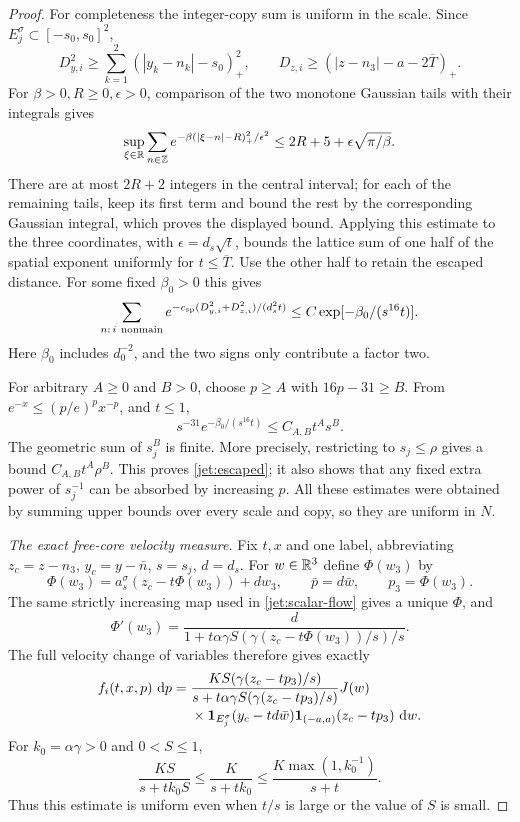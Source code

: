 \begin{proof}
For completeness the integer-copy sum is uniform in the scale.
Since \(E_j^\sigma\subset[-s_0,s_0]^2\),
\[
 D_{y,i}^2\ge
   \sum_{k=1}^2(|y_k-n_k|-s_0)_+^2,\qquad
 D_{z,i}\ge
   (|z-n_3|-a-2\overline T)_+.
\]
For \(\beta>0,R\ge0,\epsilon>0\), comparison of the two monotone
Gaussian tails with their integrals gives
\[
 \sup_{\xi\in\mathbb R}\sum_{n\in\mathbb Z}
 e^{-\beta(|\xi-n|-R)_+^2/\epsilon^2}
 \le 2R+5+\epsilon\sqrt{\pi/\beta}.
\]
There are at most \(2R+2\) integers in the central interval; for
each of the remaining tails, keep its first term and bound the
rest by the corresponding Gaussian integral, which proves the
displayed bound.  Applying this estimate to the three coordinates, with
\(\epsilon=d_s\sqrt t\), bounds the lattice sum of one half of the
spatial exponent uniformly for \(t\le\overline T\).
Use the other half to retain the escaped distance.  For some fixed
\(\beta_0>0\) this gives
\[
 \sum_{n:\,i\ {\rm nonmain}}
 e^{-c_{\mathrm{sp}}(D_{y,i}^2+D_{z,i}^2)/(d_s^2t)}
 \le C\exp[-\beta_0/(s^{16}t)] .
\]
Here \(\beta_0\) includes \(d_0^{-2}\), and the two signs only
contribute a factor two.

For arbitrary \(A\ge0\) and \(B>0\), choose \(p\ge A\) with
\(16p-31\ge B\).  From \(e^{-x}\le(p/e)^p x^{-p}\), and \(t\le1\),
\[
 s^{-31}e^{-\beta_0/(s^{16}t)}
       \le C_{A,B}t^As^B .
\]
The geometric sum of \(s_j^B\) is finite.  More precisely, restricting
to \(s_j\le\rho\) gives a bound \(C_{A,B}t^A\rho^B\).
This proves \eqref{jet:escaped}; it also shows that any fixed
extra power of \(s_j^{-1}\) can be absorbed by increasing \(p\).
All these estimates were obtained by summing upper bounds over
every scale and copy, so they are uniform in \(N\).

\emph{The exact free-core velocity measure.}
Fix \(t,x\) and one label, abbreviating
\(z_c=z-n_3\), \(y_c=y-\bar n\), \(s=s_j\), \(d=d_s\).
For \(w\in\mathbb R^3\) define \(\Phi(w_3)\) by
\[
 \Phi(w_3)=a_s^\sigma(z_c-t\Phi(w_3))+dw_3,\qquad
 \bar p=d\bar w,\qquad p_3=\Phi(w_3).
\]
The same strictly increasing map used in
\eqref{jet:scalar-flow} gives a unique \(\Phi\), and
\[
 \Phi'(w_3)=
 \frac d{1+t\alpha\gamma
           S(\gamma(z_c-t\Phi(w_3))/s)/s}.
\]
The full velocity change of variables therefore gives exactly
\begin{equation}
 \begin{aligned}
 f_i(t,x,p)\,\,\mathrm d p
 ={}&
 \frac{K S(\gamma(z_c-tp_3)/s)}
      {s+t\alpha\gamma S(\gamma(z_c-tp_3)/s)}
 J(w)\\[-2pt]
 &{}\times
 \mathbf 1_{E_j^\sigma}(y_c-td\bar w)
 \mathbf 1_{(-a,a)}(z_c-tp_3)\,\,\mathrm d w .
 \end{aligned}
 \label{eq:core-jacobian}
\end{equation}
For \(k_0=\alpha\gamma>0\) and \(0<S\le1\),
\begin{equation}
 \frac{KS}{s+t k_0S}
 \le\frac K{s+t k_0}
 \le\frac{K\max(1,k_0^{-1})}{s+t}.
 \label{jet:density-coefficient}
\end{equation}
Thus this estimate is uniform even when \(t/s\) is large or
the value of \(S\) is small.


\end{proof}
